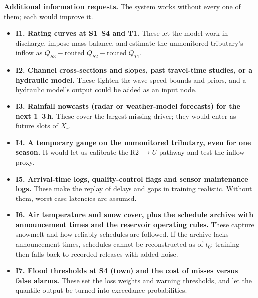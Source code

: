\textbf{Additional information requests.} The system works without every one of them; each would improve it.
\begin{itemize}
\item \textbf{I1. Rating curves at S1--S4 and T1.} These let the model work in discharge, impose mass balance,
and estimate the unmonitored tributary's inflow as $Q_{S3}-\text{routed }Q_{S2}-\text{routed }Q_{T1}$.
\item \textbf{I2. Channel cross-sections and slopes, past travel-time studies, or a hydraulic model.}
These tighten the wave-speed bounds and priors, and a hydraulic model's output could be added as an input node.
\item \textbf{I3. Rainfall nowcasts (radar or weather-model forecasts) for the next 1--3\,h.} These cover the
largest missing driver; they would enter as future slots of $X_r$.
\item \textbf{I4. A temporary gauge on the unmonitored tributary, even for one season.} It would let us
calibrate the R2 $\to U$ pathway and test the inflow proxy.
\item \textbf{I5. Arrival-time logs, quality-control flags and sensor maintenance logs.} These make the
replay of delays and gaps in training realistic. Without them, worst-case latencies are assumed.
\item \textbf{I6. Air temperature and snow cover, plus the schedule archive with announcement times and the
reservoir operating rules.} These capture snowmelt and how reliably schedules are followed. If the archive
lacks announcement times, schedules cannot be reconstructed as of $t_0$; training then falls back to recorded
releases with added noise.
\item \textbf{I7. Flood thresholds at S4 (town) and the cost of misses versus false alarms.} These set the loss
weights and warning thresholds, and let the quantile output be turned into exceedance probabilities.
\end{itemize}
